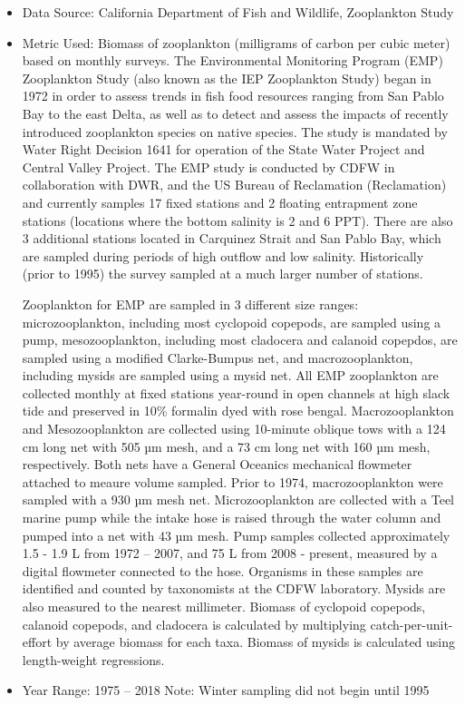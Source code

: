 \documentclass[
]{book}
\begin{document}
\begin{itemize}
\item
  Data Source: California Department of Fish and Wildlife, Zooplankton Study
\item
  Metric Used: Biomass of zooplankton (milligrams of carbon per cubic meter) based on monthly surveys. The Environmental Monitoring Program (EMP) Zooplankton Study (also known as the IEP Zooplankton Study) began in 1972 in order to assess trends in fish food resources ranging from San Pablo Bay to the east Delta, as well as to detect and assess the impacts of recently introduced zooplankton species on native species. The study is mandated by Water Right Decision 1641 for operation of the State Water Project and Central Valley Project. The EMP study is conducted by CDFW in collaboration with DWR, and the US Bureau of Reclamation (Reclamation) and currently samples 17 fixed stations and 2 floating entrapment zone stations (locations where the bottom salinity is 2 and 6 PPT). There are also 3 additional stations located in Carquinez Strait and San Pablo Bay, which are sampled during periods of high outflow and low salinity. Historically (prior to 1995) the survey sampled at a much larger number of stations.

  Zooplankton for EMP are sampled in 3 different size ranges: microzooplankton, including most cyclopoid copepods, are sampled using a pump, mesozooplankton, including most cladocera and calanoid copepdos, are sampled using a modified Clarke-Bumpus net, and macrozooplankton, including mysids are sampled using a mysid net. All EMP zooplankton are collected monthly at fixed stations year-round in open channels at high slack tide and preserved in 10\% formalin dyed with rose bengal. Macrozooplankton and Mesozooplankton are collected using 10-minute oblique tows with a 124 cm long net with 505 µm mesh, and a 73 cm long net with 160 µm mesh, respectively. Both nets have a General Oceanics mechanical flowmeter attached to meaure volume sampled. Prior to 1974, macrozooplankton were sampled with a 930 µm mesh net. Microzooplankton are collected with a Teel marine pump while the intake hose is raised through the water column and pumped into a net with 43 µm mesh. Pump samples collected approximately 1.5 - 1.9 L from 1972 -- 2007, and 75 L from 2008 - present, measured by a digital flowmeter connected to the hose.
  Organisms in these samples are identified and counted by taxonomists at the CDFW laboratory. Mysids are also measured to the nearest millimeter. Biomass of cyclopoid copepods, calanoid copepods, and cladocera is calculated by multiplying catch-per-unit-effort by average biomass for each taxa. Biomass of mysids is calculated using length-weight regressions.
\item
  Year Range: 1975 -- 2018 Note: Winter sampling did not begin until 1995


\end{itemize}
\end{document}
